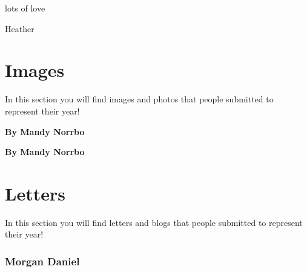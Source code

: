 \documentclass[]{book}
\begin{document}
lots of love

Heather

\hypertarget{images}{%
\chapter*{Images}\label{images}}

In this section you will find images and photos that people submitted to represent their year!

{\textbf{By Mandy Norrbo}}

{\textbf{By Mandy Norrbo}}

\hypertarget{letters}{%
\chapter*{Letters}\label{letters}}

In this section you will find letters and blogs that people submitted to represent their year!

\hypertarget{morgan-daniel}{%
\subsection*{Morgan Daniel}\label{morgan-daniel}}
\end{document}
